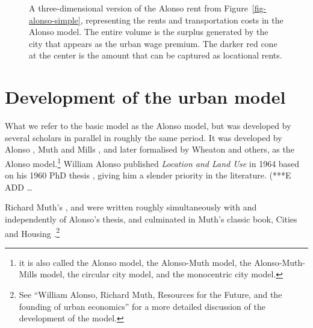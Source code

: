 

\begin{figure}
    \begin{center}
    
    \caption[A three-dimensional version of the Alonso model.]{A three-dimensional version of the Alonso rent from Figure~\ref{fig-alonso-simple}, representing the rents and transportation costs in the Alonso model. The entire volume is the surplus generated by the city that appears as the urban wage premium. The darker red cone at the center is the amount that can be captured as locational rents.}
    \label{fig-city-conical}
    \end{center}
\end{figure}

\section{Development of the urban model}
What we refer to the basic model as the Alonso model, but was developed by several scholars in parallel in roughly the same period. 
It was developed by 
Alonso \cite{alonsoLocationLandUse1964}, Muth \cite{muthCitiesHousingSpatial1969} and Mills \cite{millsAggregativeModelResource1967}, and later formalised by Wheaton \cite{wheatonComparativeStaticAnalysis1974} and others, as the \gls{Alonso model}.\footnote{it is also called the Alonso model, the Alonso-Muth model, the Alonso-Muth-Mills model, the circular city model, and the monocentric city model.} William Alonso published \textit{Location and Land Use} in 1964  \cite{alonsoLocationLandUse1964} based on his 1960 PhD thesis \cite{alonsoModelUrbanLand1960},  
giving him a slender priority in the literature. (***E ADD \dots %

Richard Muth's \cite{muthSpatialStructureHousing1961}, and \cite{muthRationalExpectationsTheory1961}  were written roughly simultaneously with and independently of Alonso's thesis, and  culminated in Muth's classic book, Cities and Housing  \cite{muthCitiesHousingSpatial1969}.\footnote{See ``William Alonso, Richard Muth, Resources for  the Future, and the founding of urban economics''\cite{mcdonaldWilliamAlonsoRichard2007} for a more detailed discussion of the development of the model.}  %

